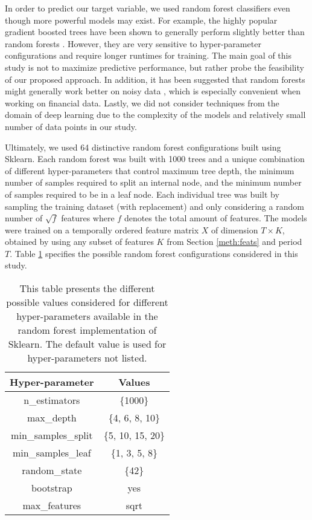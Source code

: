 \documentclass[preprint,1p, times,authoryear]{elsarticle}
\begin{document}
In order to predict our target variable, we used random forest classifiers even though more powerful models may exist. For example, the highly popular gradient boosted trees \citep{gbm} have been shown to generally perform slightly better than random forests \citep{boostbest, boostbest2}. However, they are very sensitive to hyper-parameter configurations and require longer runtimes for training. The main goal of this study is not to maximize predictive performance, but rather probe the feasibility of our proposed approach. In addition, it has been suggested that random forests might generally work better on noisy data \citep{noisebag}, which is especially convenient when working on financial data. Lastly, we did not consider techniques from the domain of deep learning due to the complexity of the models and relatively small number of data points in our study. 

Ultimately, we used 64 distinctive random forest configurations built using Sklearn. Each random forest was built with 1000 trees and a unique combination of different hyper-parameters that control maximum tree depth, the minimum number of samples required to split an internal node, and the minimum number of samples required to be in a leaf node. Each individual tree was built by sampling the training dataset (with replacement) and only considering a random number of $\sqrt{f}$ features where $f$ denotes the total amount of features. The models were trained on a temporally ordered feature matrix $X$ of dimension $T \times K$, obtained by using any subset of features $K$ from Section \ref{meth:feats} and period $T$. Table \ref{tab:rfparams} specifies the possible random forest configurations considered in this study.
\begin{table}[!ht]
\setlength{\tabcolsep}{10pt} %

\caption{This table presents the different possible values considered for different hyper-parameters available in the random forest implementation of Sklearn. The default value is used for hyper-parameters not listed. }
\centering
\begin{tabular}{cc}
\toprule
\textbf{Hyper-parameter} & \textbf{Values} \\
\midrule
n\_estimators             & \{1000\} \\
max\_depth                & \{4, 6, 8, 10\} \\
min\_samples\_split        & \{5, 10, 15, 20\} \\
min\_samples\_leaf         & \{1, 3, 5, 8\} \\
random\_state             & \{42\} \\ 
bootstrap                & yes \\
max\_features             & sqrt \\
\bottomrule
\end{tabular}
\label{tab:rfparams}
\end{table}
\end{document}
